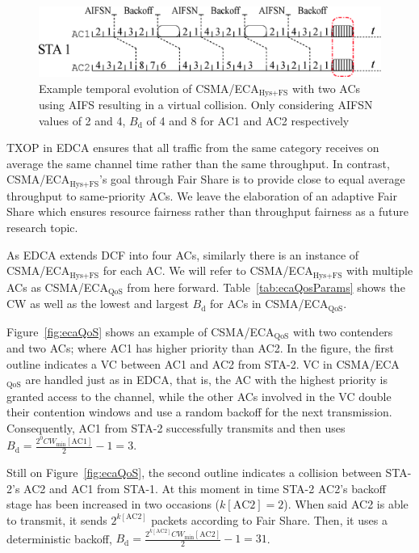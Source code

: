 	\begin{figure}[tb]
	\centering
		\includegraphics[width=\linewidth]{figures/AIFSwithECA.eps}
		\caption{Example temporal evolution of CSMA/ECA$_{\text{Hys+FS}}$ with two ACs using AIFS resulting in a virtual collision. Only considering AIFSN values of 2 and 4, $B_{\text{d}}$ of 4 and 8 for AC1 and AC2 respectively}
		\label{fig:AIFSinECA}
	\end{figure}


TXOP in EDCA ensures that all traffic from the same category receives on average the same channel time rather than the same throughput. In contrast, CSMA/ECA$_{\text{Hys+FS}}$'s goal through Fair Share is to provide close to equal average throughput to same-priority ACs. We leave the elaboration of an adaptive Fair Share which ensures resource fairness rather than throughput fairness as a future research topic.

As EDCA extends DCF into four ACs, similarly there is an instance of CSMA/ECA$_{\text{Hys+FS}}$ for each AC. We will refer to CSMA/ECA$_{\text{Hys+FS}}$ with multiple ACs as CSMA/ECA$_{\text{QoS}}$ from here forward. Table~\ref{tab:ecaQosParams} shows the CW as well as the lowest and largest $B_{\text{d}}$ for ACs in CSMA/ECA$_{\text{QoS}}$.

Figure~\ref{fig:ecaQoS} shows an example of CSMA/ECA$_{\text{QoS}}$ with two contenders and two ACs; where AC1 has higher priority than AC2. In the figure, the first outline indicates a VC between AC1 and AC2 from STA-2. VC in CSMA/ECA$_{\text{QoS}}$ are handled just as in EDCA, that is, the AC with the highest priority is granted access to the channel, while the other ACs involved in the VC double their contention windows and use a random backoff for the next transmission. Consequently, AC1 from STA-2 successfully transmits and then uses $B_{\text{d}}=\frac{2^{0}CW_{\min}[\text{AC1}]}{2}-1= 3$.

Still on Figure~\ref{fig:ecaQoS}, the second outline indicates a collision between STA-2's AC2 and AC1 from STA-1. At this moment in time STA-2 AC2's backoff stage has been increased in two occasions ($k[\text{AC2}]=2$). When said AC2 is able to transmit, it sends $2^{k[\text{AC2}]}$ packets according to Fair Share. Then, it uses a deterministic backoff, $B_{\text{d}}=\frac{2^{k[\text{AC2}]}CW_{\min}[\text{AC2}]}{2}-1=31$.

